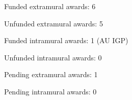 \begin{veryTightItemize}
    \item Funded extramural awards: 6
    \item Unfunded extramural awards: 5
    \item Funded intramural awards: 1 (AU IGP)
    \item Unfunded intramural awards: 0
    \item Pending extramural awards: 1
    \item Pending intramural awards: 0
\end{veryTightItemize}
